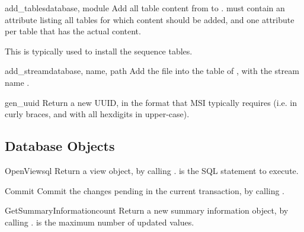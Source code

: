 \begin{funcdesc}{add_tables}{database, module}
  Add all table content from  to .
   must contain an attribute 
  listing all tables for which content should be added,
  and one attribute per table that has the actual content.

  This is typically used to install the sequence tables.
\end{funcdesc}

\begin{funcdesc}{add_stream}{database, name, path}
  Add the file  into the  table
  of , with the stream name .
\end{funcdesc}

\begin{funcdesc}{gen_uuid}{}
  Return a new UUID, in the format that MSI typically
  requires (i.e. in curly braces, and with all hexdigits
  in upper-case).
\end{funcdesc}

\begin{seealso}
\end{seealso}

\subsection{Database Objects\label{database-objects}}

\begin{methoddesc}{OpenView}{sql}
  Return a view object, by calling .
   is the SQL statement to execute.
\end{methoddesc}

\begin{methoddesc}{Commit}{}
  Commit the changes pending in the current transaction,
  by calling .
\end{methoddesc}

\begin{methoddesc}{GetSummaryInformation}{count}
  Return a new summary information object, by calling
  .   is the maximum number of
  updated values.
\end{methoddesc}

